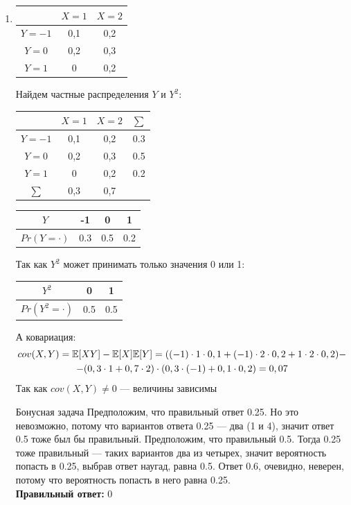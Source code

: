 \documentclass[12pt, a4paper]{article}\usepackage[]{graphicx}\usepackage[]{color}
\begin{document}
\begin{enumerate}
\item
\begin{center}
\begin{tabular}{|c|c|c|}
\hline
& $X=1$ & $X=2$\\
\hline
$Y=-1$ & 0,1 & 0,2\\
\hline
$Y = 0$ & 0,2 & 0,3\\
\hline
$Y=1$ & 0 & 0,2 \\
\hline
\end{tabular}
\end{center}
Найдем частные распределения $Y$ и $Y^2$:


\begin{center}
\begin{tabular}{|c|c|c|c|}
\hline
& $X=1$ & $X=2$ & $\sum$\\
\hline
$Y=-1$ & 0,1 & 0,2 & 0.3\\
\hline
$Y = 0$ & 0,2 & 0,3 & 0.5\\
\hline
$Y=1$ & 0 & 0,2 & 0.2\\
\hline
$\sum$ & 0,3 & 0,7 &\\
\hline
\end{tabular}
\end{center}

\begin{center}
\begin{tabular}{c|c|c|c}
$Y$ &  -1 & 0 & 1 \\
\hline
$Pr(Y=\cdot)$ & 0.3 & 0.5 & 0.2
\end{tabular}
\end{center}
 Так как $Y^2$ может принимать только значения 0 или 1:
 \begin{center}
 \begin{tabular}{c|c|c}
 $Y^2$  & 0 & 1 \\
 \hline
 $Pr(Y^2=\cdot)$ & 0.5 & 0.5
 \end{tabular}
 \end{center}
 А ковариация:
 \begin{multline}
 cov(X, Y) = \mathbb{E}[XY] - \mathbb{E}[X]\mathbb{E}[Y] =
 ((-1)\cdot 1\cdot0,1 + (-1)\cdot2 \cdot 0,2 + 1\cdot2\cdot 0,2) -\\
 - (0,3\cdot1 + 0,7 \cdot 2)\cdot(0,3\cdot(-1) + 0,1\cdot 0,2) = 0,07
\end{multline}
 Так как $cov(X, Y) \ne 0$ — величины зависимы

\item[Бонусная задача]
  Предположим, что правильный ответ 0.25. Но это невозможно, потому что вариантов ответа 0.25 — два (1 и 4), значит ответ 0.5 тоже был бы правильный. Предположим, что правильный 0.5. Тогда 0.25 тоже правильный — таких вариантов два из четырех, значит вероятность попасть в 0.25, выбрав ответ наугад, равна 0.5. Ответ 0.6, очевидно, неверен, потому что вероятность попасть в него равна 0.25. \\
 \textbf{Правильный ответ:} 0
\end{enumerate}
\end{document}
